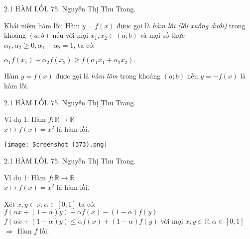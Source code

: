 \begin{frame}{2.1 HÀM LỒI. \hspace{6cm}  75. Nguyễn Thị Thu Trang.} 
\begin{block}{Khái niệm hàm lồi: }
Hàm $y=f(x)$ được gọi là \textit{hàm lồi (lồi xuống dưới)} trong khoảng $(a; b)$ nếu với mọi $x_1, x_2 \in (a; b)$ và mọi số thực $\alpha_1 , \alpha_2 \ge 0, \alpha_1 +\alpha_2 = 1 $, ta có:
\begin{center}
    $\alpha_1 f(x_1) +\alpha_2 f(x_2) \ge f(\alpha_1 x_1 + \alpha_2 x_2).$
\end{center}
Hàm $y=f(x)$ được gọi là \textit{hàm lõm} trong khoảng $(a; b)$ nếu $y=-f(x)$ là hàm lồi.
\end{block} 
\end{frame} 
\begin{frame}{2.1 HÀM LỒI. \hspace{6cm}  75. Nguyễn Thị Thu Trang.} 
\begin{block}{Ví dụ 1: }
Hàm $f: \mathbb{R} \longrightarrow \mathbb{R}$\\
\hspace{1cm} $x\longmapsto f(x)= x^2$ là hàm lồi.
\end{block} 
\begin{center}
    \texttt{[image: Screenshot (373).png]}
\end{center}
\end{frame}
\begin{frame}{2.1 HÀM LỒI. \hspace{6cm}  75. Nguyễn Thị Thu Trang.} 
\begin{block}{Ví dụ 1: }
Hàm $f: \mathbb{R} \longrightarrow \mathbb{R}$\\
\hspace{1cm} $x\longmapsto f(x)= x^2$ là hàm lồi.
\end{block} 
Xét $x,y \in \mathbb{R}; \alpha \in [0; 1]$ ta có: \\$f(\alpha x + (1- \alpha)y) - \alpha f(x) - (1-\alpha) f(y)$\\
\vspace{2cm}
$f(\alpha x + (1- \alpha)y)\leq \alpha f(x) + (1-\alpha) f(y)$ với mọi $x, y \in \mathbb{R}, \alpha \in [0; 1]$\\
$\Rightarrow$  Hàm $f$ lồi.
\end{frame}
